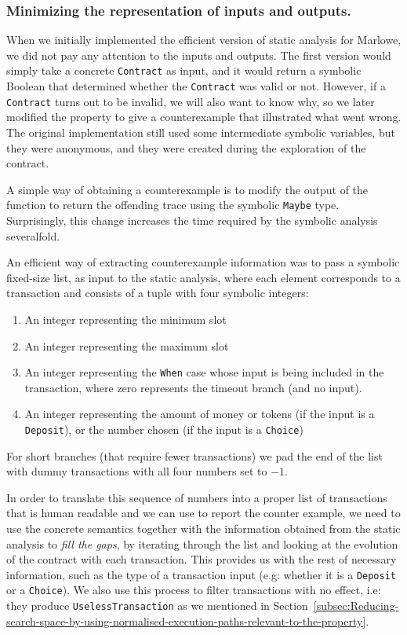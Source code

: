 \documentclass[english,runningheads]{llncs}
\begin{document}
\subsubsection{Minimizing the representation of inputs and outputs.}

When we initially implemented the efficient version of static analysis
for Marlowe, we did not pay any attention to the inputs and outputs.
The first version would simply take a concrete \texttt{Contract}
as input, and it would return a symbolic Boolean that determined whether
the \texttt{Contract} was valid or not. However, if a \texttt{Contract}
turns out to be invalid, we will also want to know why, so we later modified
the property to give a counterexample that illustrated what went wrong.
The original implementation still used some intermediate symbolic
variables, but they were anonymous, and they were created during the
exploration of the contract.

A simple way of obtaining a counterexample is to modify the output
of the function to return the offending trace using the symbolic \texttt{Maybe}
type. Surprisingly, this change increases the time
required by the symbolic analysis severalfold.

An efficient way of extracting counterexample information was to
pass a symbolic fixed-size list, as input to the static analysis, where
each element corresponds to a transaction and consists of a tuple with four symbolic integers:
\begin{enumerate}
\item An integer representing the minimum slot
\item An integer representing the maximum slot
\item An integer representing the \texttt{When} case whose input is being
included in the transaction, where zero represents the timeout branch (and no input).
\item An integer representing the amount of money or tokens (if the input
is a \texttt{Deposit}), or the number chosen (if the input is a \texttt{Choice})
\end{enumerate}
For short branches (that require fewer transactions) we pad the end of
the list with dummy transactions with all four numbers set to $-1$.

In order to translate this sequence of numbers into a proper list
of transactions that is human readable and we can use to report the
counter example, we need to use the concrete semantics together with
the information obtained from the static analysis to \emph{fill the gaps},
by iterating through the list and looking at the evolution
of the contract with each transaction.
This provides us with the rest of necessary information, such as
the type of a transaction input (e.g: whether it is a \texttt{Deposit} or a \texttt{Choice}). We also use this process to filter transactions with no effect,
i.e: they produce \texttt{UselessTransaction} as we mentioned in Section~\ref{subsec:Reducing-search-space-by-using-normalised-execution-paths-relevant-to-the-property}.
\end{document}
